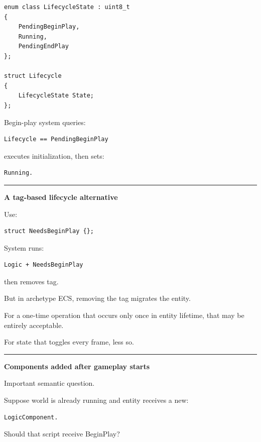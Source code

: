 \begin{verbatim}
enum class LifecycleState : uint8_t
{
    PendingBeginPlay,
    Running,
    PendingEndPlay
};

struct Lifecycle
{
    LifecycleState State;
};
\end{verbatim}

Begin-play system queries:

\begin{verbatim}
Lifecycle == PendingBeginPlay
\end{verbatim}

executes initialization, then sets:

\begin{verbatim}
Running.
\end{verbatim}

\begin{center}\rule{0.5\linewidth}{0.5pt}\end{center}

\textbf{A tag-based lifecycle alternative}

Use:

\begin{verbatim}
struct NeedsBeginPlay {};
\end{verbatim}

System runs:

\begin{verbatim}
Logic + NeedsBeginPlay
\end{verbatim}

then removes tag.

But in archetype ECS, removing the tag migrates the entity.

For a one-time operation that occurs only once in entity lifetime, that may be entirely acceptable.

For state that toggles every frame, less so.

\begin{center}\rule{0.5\linewidth}{0.5pt}\end{center}

\textbf{Components added after gameplay starts}

Important semantic question.

Suppose world is already running and entity receives a new:

\begin{verbatim}
LogicComponent.
\end{verbatim}

Should that script receive BeginPlay?

